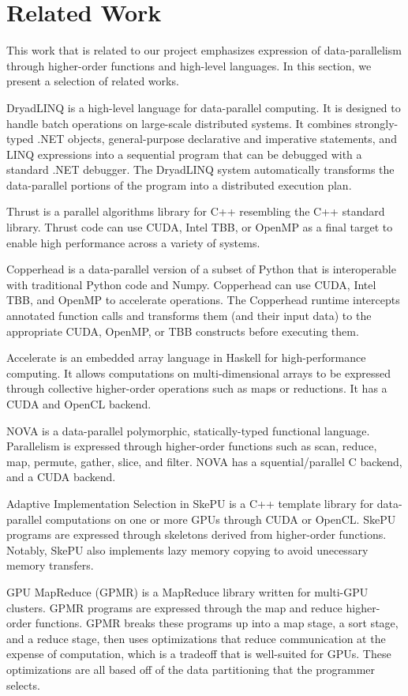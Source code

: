 \section{Related Work}

This work that is related to our project emphasizes expression of 
data-parallelism through higher-order functions and high-level languages. In
this section, we present a selection of related works.

DryadLINQ\cite{yu2008dryadlinq} is a high-level language for data-parallel
computing. It is designed to handle batch operations on large-scale
distributed systems. It combines strongly-typed .NET objects,
general-purpose declarative and imperative statements, and LINQ expressions
into a sequential program that can be debugged with a standard .NET debugger.
The DryadLINQ system automatically transforms the data-parallel portions of the
program into a distributed execution plan.

Thrust\cite{thrust} is a parallel algorithms library for C++ resembling the C++
standard library. Thrust code can use CUDA, Intel TBB, or OpenMP as a final
target to enable high performance across a variety of systems.

Copperhead\cite{copperhead} is a data-parallel version of a subset of Python
that is
interoperable with traditional Python code and Numpy. Copperhead can use CUDA,
Intel TBB, and OpenMP to accelerate operations. The Copperhead runtime
intercepts annotated function calls and transforms them (and their input data)
to the appropriate
CUDA, OpenMP, or TBB constructs before executing them.

Accelerate\cite{accelerate} is an embedded array language in Haskell for 
high-performance
computing. It allows computations on multi-dimensional arrays to be expressed
through collective higher-order operations such as maps or reductions. It has
a CUDA and OpenCL backend.

NOVA\cite{collins2013nova} is a data-parallel polymorphic, statically-typed
functional language. Parallelism is expressed through higher-order functions
such as scan, reduce, map, permute, gather, slice, and filter. NOVA has a
squential/parallel C backend, and a CUDA backend.

Adaptive Implementation Selection in SkePU\cite{enmyren2010skepu} is a C++ template library for data-parallel
computations on one or more GPUs through CUDA or OpenCL. SkePU programs are
expressed through skeletons derived from higher-order functions. Notably,
SkePU also implements lazy memory copying to avoid unecessary memory transfers.

GPU MapReduce (GPMR)\cite{stuart2011multi} is a  MapReduce library written
for multi-GPU clusters. GPMR programs are expressed through the map and reduce
higher-order functions. GPMR breaks these programs up into a map stage, a sort stage, and a reduce stage, then uses optimizations that reduce communication at
the expense of computation, which is a tradeoff that is well-suited for GPUs.
These optimizations are all based off of the data partitioning that the
programmer selects.
